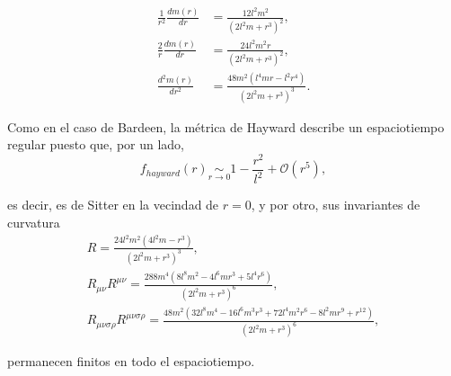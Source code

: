 \documentclass[16pt,a4paper]{article}
\numberwithin{equation}{section}
\theoremstyle{definition}
\begin{document}
\begin{equation}
\begin{aligned}
\frac{1}{r^2}\frac{dm(r)}{dr} &= \frac{12 l^2 m^2}{\left(2 l^2 m+r^3\right)^2},\\
\frac{2}{r}\frac{dm(r)}{dr} &= \frac{24 l^2 m^2 r}{\left(2 l^2 m+r^3\right)^2},\\
\frac{d^2m(r)}{dr^2} &= \frac{48 m^2 \left(l^4 m r-l^2 r^4\right)}{\left(2 l^2 m+r^3\right)^3}.
\end{aligned}
\end{equation}

Como en el caso de Bardeen, la métrica de Hayward describe un espaciotiempo regular puesto que, por un lado, 
\begin{equation}
f_{hayward}(r) \underset{r \to 0}{\sim} 1 - \frac{r^2}{l^2} + \mathcal{O}(r^5),
\end{equation}

es decir, es de Sitter en la vecindad de $r =0$, y por otro, sus invariantes de curvatura
\begin{equation}
\label{hayward scalars}
\begin{gathered}
R = \frac{24 l^2 m^2 \left(4 l^2 m-r^3\right)}{\left(2 l^2 m+r^3\right)^3},\\
R_{\mu \nu}R^{\mu \nu} = \frac{288 m^4 \left(8 l^8 m^2-4 l^6 m r^3+5 l^4 r^6\right)}{\left(2 l^2 m+r^3\right)^6},\\
R_{\mu \nu \sigma \rho}R^{\mu \nu \sigma \rho} = \frac{48 m^2 \left(32 l^8 m^4-16 l^6 m^3 r^3+72 l^4 m^2 r^6-8 l^2 m r^9+r^{12}\right)}{\left(2 l^2 m+r^3\right)^6},
\end{gathered}
\end{equation}

permanecen finitos en todo el espaciotiempo.\\
\end{document}
